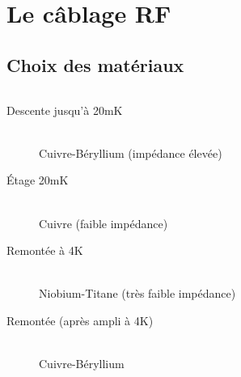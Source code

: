 \documentclass[8pt,a9paper]{beamer} \usepackage[utf8]{inputenc} \usepackage[francais]{babel} \usepackage[T1]{fontenc}
\begin{document}
\section{Le câblage RF}
\subsection{Choix des matériaux}
\begin{frame}
\begin{columns}
\begin{column}{0.7\textwidth}
    \begin{description}
        \item[Descente jusqu'à 20mK]~\\
            Cuivre-Béryllium (impédance élevée)
        \item[Étage 20mK]~\\
            Cuivre (faible impédance)
        \item[Remontée à 4K]~\\
            Niobium-Titane (très faible impédance)
        \item[Remontée (après ampli à 4K)]~\\
            Cuivre-Béryllium
    \end{description}
\end{column}
\begin{column}{0.3\textwidth}
\begin{figure}[h]
    \begin{center}

\end{center}
\end{figure}
\end{column}
\end{columns}
\end{frame}
\end{document}
